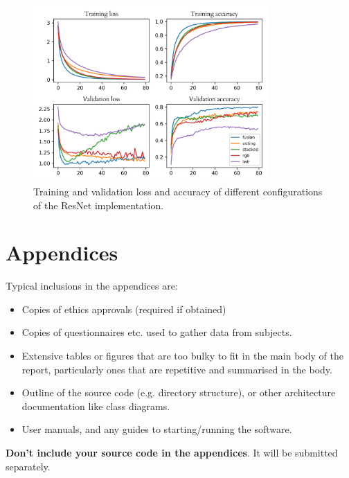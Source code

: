 \documentclass{l4proj}
\begin{document}
\begin{appendices}
\begin{figure}[ht]
  \centering
  \includegraphics[width=0.8\textwidth]{images/evaluation/gridsearch/resnet.png}
  \caption{Training and validation loss and accuracy of different configurations of the ResNet implementation.}
  \label{fig:resnet_configs_app}
\end{figure}

\chapter{Appendices}

Typical inclusions in the appendices are:

\begin{itemize}
\item
  Copies of ethics approvals (required if obtained)
\item
  Copies of questionnaires etc. used to gather data from subjects.
\item
  Extensive tables or figures that are too bulky to fit in the main body of
  the report, particularly ones that are repetitive and summarised in the body.

\item Outline of the source code (e.g. directory structure), or other architecture documentation like class diagrams.

\item User manuals, and any guides to starting/running the software.

\end{itemize}

\textbf{Don't include your source code in the appendices}. It will be
submitted separately.

\end{appendices}






\end{document}
